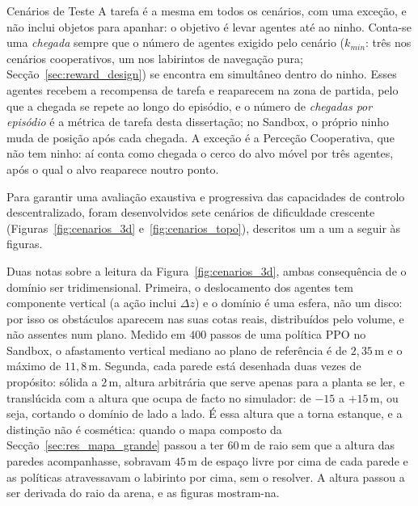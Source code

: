 \documentclass[12pt,reqno, twoside]{amsbook}
\makeatletter
\def\subsection{\@startsection{subsection}{2}%
      \z@{.5\linespacing\@plus.7\linespacing}{.25\linespacing}%
      {\normalfont\bfseries\flushleft}}
\theoremstyle{plain}
\numberwithin{equation}{chapter}
\numberwithin{section}{chapter}
\numberwithin{table}{chapter}
\numberwithin{figure}{chapter}
\makeatother
\begin{document}
\subsection{Cenários de Teste}
\label{sec:cenarios}
A tarefa é a mesma em todos os cenários, com uma exceção, e não inclui objetos para apanhar: o objetivo é levar agentes até ao ninho. Conta-se uma \emph{chegada} sempre que o número de agentes exigido pelo cenário ($k_{min}$: três nos cenários cooperativos, um nos labirintos de navegação pura; Secção~\ref{sec:reward_design}) se encontra em simultâneo dentro do ninho. Esses agentes recebem a recompensa de tarefa e reaparecem na zona de partida, pelo que a chegada se repete ao longo do episódio, e o número de \emph{chegadas por episódio} é a métrica de tarefa desta dissertação; no Sandbox, o próprio ninho muda de posição após cada chegada. A exceção é a Perceção Cooperativa, que não tem ninho: aí conta como chegada o cerco do alvo móvel por três agentes, após o qual o alvo reaparece noutro ponto.

Para garantir uma avaliação exaustiva e progressiva das capacidades de controlo descentralizado, foram desenvolvidos sete cenários de dificuldade crescente (Figuras~\ref{fig:cenarios_3d} e~\ref{fig:cenarios_topo}), descritos um a um a seguir às figuras.

Duas notas sobre a leitura da Figura~\ref{fig:cenarios_3d}, ambas consequência de o domínio ser tridimensional. Primeira, o deslocamento dos agentes tem componente vertical (a ação inclui $\Delta z$) e o domínio é uma esfera, não um disco: por isso os obstáculos aparecem nas suas cotas reais, distribuídos pelo volume, e não assentes num plano. Medido em $400$ passos de uma política PPO no Sandbox, o afastamento vertical mediano ao plano de referência é de $2{,}35$\,m e o máximo de $11{,}8$\,m. Segunda, cada parede está desenhada duas vezes de propósito: sólida a $2$\,m, altura arbitrária que serve apenas para a planta se ler, e translúcida com a altura que ocupa de facto no simulador: de $-15$ a $+15$\,m, ou seja, cortando o domínio de lado a lado. É essa altura que a torna estanque, e a distinção não é cosmética: quando o mapa composto da Secção~\ref{sec:res_mapa_grande} passou a ter $60$\,m de raio sem que a altura das paredes acompanhasse, sobravam $45$\,m de espaço livre por cima de cada parede e as políticas atravessavam o labirinto por cima, sem o resolver. A altura passou a ser derivada do raio da arena, e as figuras mostram-na.
\end{document}
